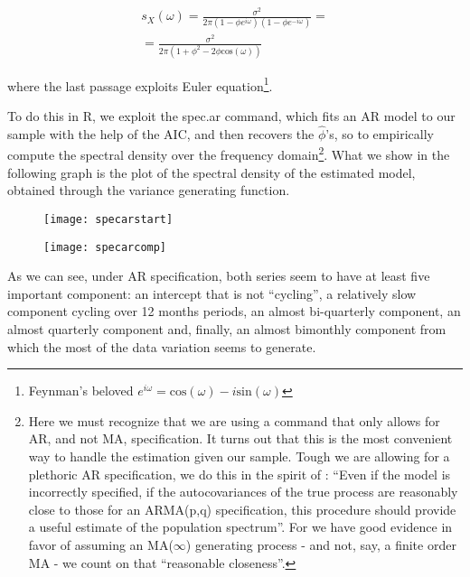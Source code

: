 \documentclass[12pt]{article} %
\begin{document}
\begin{equation}
\begin{aligned}
s_X(\omega)=\frac{\sigma^2}{2\pi(1-\phi e^{i\omega})(1-\phi e^{-i\omega})}=\\
=\frac{\sigma^2}{2\pi(1+\phi^2-2\phi\text{cos}(\omega))}
\end{aligned}
\end{equation}

where the last passage exploits Euler equation\footnote{
Feynman's beloved $e^{i\omega}=\text{cos}(\omega)-i\text{sin}(\omega)$}.

To do this in R, we exploit the spec.ar command, which fits an AR model to our sample with the help of the AIC, and then recovers the $\hat{\phi}$'s, so to empirically compute the spectral density over the frequency domain\footnote{Here we must recognize that we are using a command that only allows for AR, and not MA, specification. It turns out that this is the most convenient way to handle the estimation given our sample. Tough we are allowing for a plethoric AR specification, we do this in the spirit of \citet[p.165]{hammy}: ``Even if the model is incorrectly specified, if the autocovariances of the true process are reasonably close to those for an ARMA(p,q) specification, this procedure should provide a useful estimate of the population spectrum''. For we have good evidence in favor of assuming an MA($\infty$) generating process - and not, say, a finite order MA -  we count on that ``reasonable closeness''.}. What we show in the following graph is the plot of the spectral density of the estimated model, obtained through the variance generating function.

\begin{figure}[H]
\begin{center}
\texttt{[image: specarstart]}
\caption{}
\end{center}
\end{figure}

\begin{figure}[H]
\begin{center}
\texttt{[image: specarcomp]}
\caption{}
\end{center}
\end{figure}

As we can see, under AR specification, both series seem to have at least five important component: an intercept that is not ``cycling'', a relatively slow component cycling over 12 months periods, an almost bi-quarterly component, an almost quarterly component and, finally, an almost bimonthly component from which the most of the data variation seems to generate.
\end{document}
